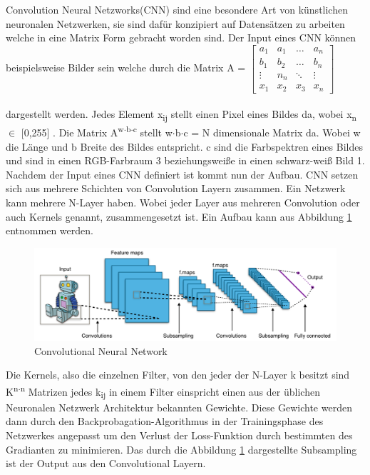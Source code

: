 \documentclass{llncs}
\begin{document}
Convolution Neural Netzworks(CNN) sind eine besondere Art von künstlichen neuronalen Netzwerken, sie sind dafür konzipiert auf Datensätzen zu arbeiten welche in eine Matrix Form gebracht worden sind. Der Input eines CNN können beispielsweise Bilder sein welche durch die Matrix A =
$
\begin{bmatrix}
a_1	& a_1	& \dots	 & a_n     \\
b_1	& b_2 	& \dots  & b_n	  \\
\vdots	& n_n 	& \ddots & \vdots \\
x_1 	& x_2 & x_3	 & x_n
\end{bmatrix}
$
\\\\dargestellt werden. Jedes Element x\textsubscript{ij} stellt einen Pixel eines Bildes da, wobei x\textsubscript{n} $\in$ [0,255] . Die Matrix A\textsuperscript{w$\cdot$b$\cdot$c} stellt w$\cdot$b$\cdot$c = N dimensionale Matrix da. Wobei w die Länge und b Breite des Bildes entspricht. c sind die Farbspektren eines Bildes und sind in einen RGB-Farbraum 3 beziehungsweiße in einen schwarz-weiß Bild 1. Nachdem  der Input eines CNN definiert ist kommt nun der Aufbau. CNN setzen sich aus mehrere Schichten von Convolution Layern zusammen. Ein Netzwerk kann mehrere N-Layer haben. Wobei jeder Layer aus mehreren Convolution oder auch Kernels genannt, zusammengesetzt ist. Ein Aufbau kann aus Abbildung \ref{fig:Bild2} entnommen werden\cite{Grundlagen}.

\begin{figure}[htbp] 
	\centering
	\includegraphics[width=1.0\textwidth]{convol.png}
	\caption{Convolutional Neural Network}
	\label{fig:Bild2}
\end{figure}

Die Kernels, also die einzelnen Filter, von den jeder der N-Layer k besitzt sind K\textsuperscript{n$\cdot$n} Matrizen jedes k\textsubscript{ij} in einem Filter einspricht einen aus der üblichen Neuronalen Netzwerk Architektur bekannten Gewichte. Diese Gewichte werden dann durch den Backprobagation-Algorithmus in der Trainingsphase des Netzwerkes angepasst um den Verlust der Loss-Funktion durch bestimmten des Gradianten zu minimieren. Das durch die Abbildung \ref{fig:Bild2} dargestellte Subsampling ist der Output aus den Convolutional Layern\cite{Grundlagen}. 
\end{document}
